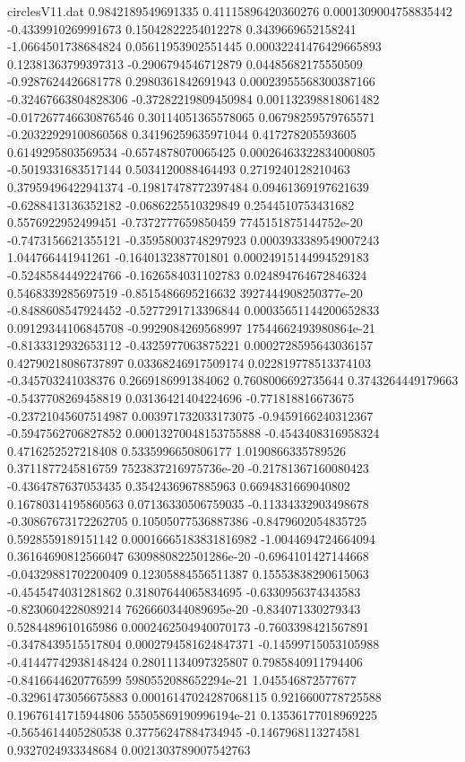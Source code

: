\begin{filecontents}{circlesV11.dat}
0.9842189549691335	0.41115896420360276	0.0001309004758835442
-0.4339910269991673	0.15042822254012278	0.3439669652158241
-1.0664501738684824	0.05611953902551445	0.00032241476429665893
0.12381363799397313	-0.2906794546712879	0.04485682175550509
-0.9287624426681778	0.2980361842691943	0.00023955568300387166
-0.32467663804828306	-0.37282219809450984	0.001132398818061482
-0.017267746630876546	0.30114051365578065	0.06798259579765571
-0.20322929100860568	0.34196259635971044	0.417278205593605
0.6149295803569534	-0.6574878070065425	0.00026463322834000805
-0.5019331683517144	0.5034120088464493	0.2719240128210463
0.37959496422941374	-0.19817478772397484	0.09461369197621639
-0.6288413136352182	-0.0686225510329849	0.2544510753431682
0.5576922952499451	-0.7372777659850459	7745151875144752e-20
-0.7473156621355121	-0.35958003748297923	0.0003933389549007243
1.044766441941261	-0.1640132387701801	0.00024915144994529183
-0.5248584449224766	-0.1626584031102783	0.024894764672846324
0.5468339285697519	-0.8515486695216632	3927444908250377e-20
-0.8488608547924452	-0.5277291713396844	0.00035651144200652833
0.09129344106845708	-0.9929084269568997	17544662493980864e-21
-0.8133312932653112	-0.4325977063875221	0.0002728595643036157
0.42790218086737897	0.03368246917509174	0.022819778513374103
-0.345703241038376	0.2669186991384062	0.7608006692735644
0.3743264449179663	-0.5437708269458819	0.03136421404224696
-0.771818816673675	-0.23721045607514987	0.003971732033173075
-0.9459166240312367	-0.5947562706827852	0.00013270048153755888
-0.4543408316958324	0.4716252527218408	0.5335996650806177
1.0190866335789526	0.3711877245816759	7523837216975736e-20
-0.21781367160080423	-0.4364787637053435	0.3542436967885963
0.6694831669040802	0.16780314195860563	0.07136330506759035
-0.11334332903498678	-0.30867673172262705	0.10505077536887386
-0.8479602054835725	0.5928559189151142	0.00016665183831816982
-1.0044694724664094	0.36164690812566047	6309880822501286e-20
-0.6964101427144668	-0.04329881702200409	0.12305884556511387
0.15553838290615063	-0.4545474031281862	0.31807644065834695
-0.6330956374343583	-0.8230604228089214	7626660344089695e-20
-0.834071330279343	0.5284489610165986	0.0002462504940070173
-0.7603398421567891	-0.3478439515517804	0.0002794581624847371
-0.14599715053105988	-0.41447742938148424	0.28011134097325807
0.7985840911794406	-0.8416644620776599	5980552088652294e-21
1.045546872577677	-0.32961473056675883	0.00016147024287068115
0.9216600778725588	0.19676141715944806	55505869190996194e-21
0.13536177018969225	-0.5654614405280538	0.37756247884734945
-0.1467968113274581	0.9327024933348684	0.0021303789007542763

\end{filecontents}
